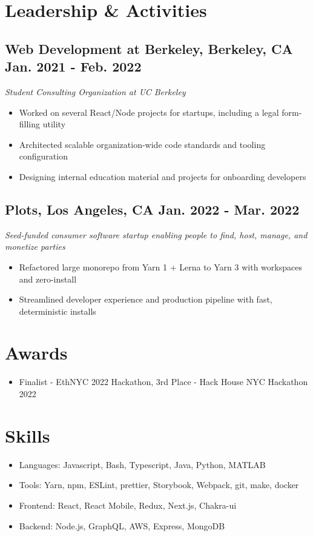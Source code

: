 \documentclass{article}
\begin{document}
	\section{Leadership \& Activities}

	\subsection{
		\textbf{Web Development at Berkeley}, Berkeley, CA
		{\hspace{\fill}\bfseries Jan. 2021 - Feb. 2022}
	}
	{\itshape Student Consulting Organization at UC Berkeley}
	\begin{itemize}
		\item Worked on several React/Node projects for startups, including a legal form-filling utility
		\item Architected scalable organization-wide code standards and tooling configuration
		\item Designing internal education material and projects for onboarding developers
	\end{itemize}

	\vspace{14pt}

	\subsection{
		\textbf{Plots}, Los Angeles, CA
		{\hspace{\fill}\bfseries Jan. 2022 - Mar. 2022}
	}
	{\itshape Seed-funded consumer software startup enabling people to find, host, manage, and monetize parties}
	\begin{itemize}
		\item Refactored large monorepo from Yarn 1 + Lerna to Yarn 3 with workspaces and zero-install
		\item Streamlined developer experience and production pipeline with fast, deterministic installs
	\end{itemize}

	\section{Awards}
	\vspace{3pt}
	\begin{itemize}
		\item Finalist - EthNYC 2022 Hackathon, 3rd Place - Hack House NYC Hackathon 2022
	\end{itemize}

	\section{Skills}
	\vspace{3pt}
	\begin{itemize}
		\item Languages: Javascript, Bash, Typescript, Java, Python, MATLAB
		\item Tools: Yarn, npm, ESLint, prettier, Storybook, Webpack, git, make, docker
		\item Frontend: React, React Mobile, Redux, Next.js, Chakra-ui
		\item Backend: Node.js, GraphQL, AWS, Express, MongoDB
	\end{itemize}
\end{document}
